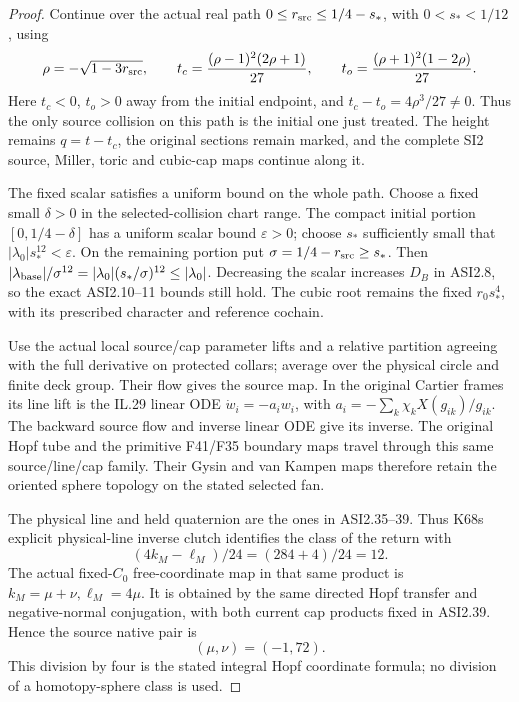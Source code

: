 \begin{proof}
Continue over the actual real path
$0\le r_{\rm src}\le1/4-s_*$, with $0<s_*<1/12$, using
\[
 \rho=-\sqrt{1-3r_{\rm src}},\qquad
 t_c=\frac{(\rho-1)^2(2\rho+1)}{27},\qquad
 t_o=\frac{(\rho+1)^2(1-2\rho)}{27}.
\]
Here $t_c<0$, $t_o>0$ away from the initial endpoint, and
$t_c-t_o=4\rho^3/27\ne0$.  Thus the only source collision on
this path is the initial one just treated.  The height remains
$q=t-t_c$, the original sections remain marked, and the complete
SI2 source, Miller, toric and cubic-cap maps continue along it.

The fixed scalar satisfies a uniform bound on the whole path.
Choose a fixed small $\delta>0$ in the selected-collision chart
range.  The compact initial portion
$[0,1/4-\delta]$ has a uniform scalar bound $\varepsilon>0$;
choose $s_*$ sufficiently small that
$|\lambda_0|s_*^{12}<\varepsilon$.  On the remaining portion put
$\sigma=1/4-r_{\rm src}\ge s_*$.  Then
$|\lambda_{\rm base}|/\sigma^{12}
=|\lambda_0|(s_*/\sigma)^{12}\le|\lambda_0|$.
Decreasing the scalar increases $D_B$ in ASI2.8, so the exact
ASI2.10--11 bounds still hold.  The cubic root remains the fixed
$r_0s_*^4$, with its prescribed character and reference cochain.

Use the actual local source/cap parameter lifts and a relative
partition agreeing with the full derivative on protected collars;
average over the physical circle and finite deck group.  Their
flow gives the source map.  In the original Cartier frames its
line lift is the IL.29 linear ODE
$\dot w_i=-a_iw_i$, with
$a_i=-\sum_k\chi_kX(g_{ik})/g_{ik}$.
The backward source flow and inverse linear ODE give its inverse.
The original Hopf tube and the primitive F41/F35 boundary maps
travel through this same source/line/cap family.  Their Gysin and
van Kampen maps therefore retain the oriented sphere topology on
the stated selected fan.

The physical line and held quaternion
are the ones in ASI2.35--39. Thus
K68\textquotesingle s explicit physical-line inverse
clutch identifies the class of the
return with
\[
        (4k_M-\ell_M)/24=(284+4)/24=12.
 \tag{ASI2.60}
\]
The actual fixed-\(C_0\) free-coordinate
map in that same product is
\(k_M=\mu+\nu,\ell_M=4\mu\).
It is obtained by the same directed
Hopf transfer and negative-normal
conjugation, with both current cap
products fixed in ASI2.39. Hence
the source native pair is
\[
                         (\mu,\nu)=(-1,72).
 \tag{ASI2.61}
\]
This division by four is the stated
integral Hopf coordinate formula;
no division of a homotopy-sphere
class is used.


\end{proof}
